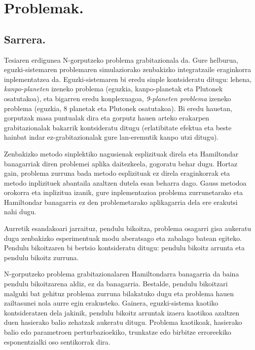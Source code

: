 \chapter{Problemak.}

\section{Sarrera.}


Tesiaren erdigunea N-gorputzeko problema grabitazionala da. Gure helburua, eguzki-sistemaren problemaren simulaziorako zenbakizko integratzaile eraginkorra inplementatzea da. Eguzki-sistemaren bi eredu sinple kontsideratu ditugu: lehena, \emph{kanpo-planeten} izeneko problema (eguzkia, kanpo-planetak eta Plutonek osatutakoa), eta bigarren eredu konplexuagoa, \emph{9-planeten problema} izeneko problema (eguzkia, 8 planetak eta Plutonek osatutakoa). Bi eredu hauetan, gorputzak masa puntualak dira eta gorputz hauen arteko erakarpen grabitazionalak bakarrik kontsideratu ditugu (erlatibitate efektua eta beste hainbat indar ez-grabitazionalak gure lan-eremutik kanpo utzi ditugu).

Zenbakizko metodo sinplektiko nagusienak esplizituak direla eta Hamiltondar banagarriak diren problemei aplika daitezkeela, gogoratu behar dugu. Hortaz gain, problema zurruna bada metodo esplizituak ez direla eraginkorrak eta metodo inplizituek abantaila azaltzen dutela esan beharra dago. Gauss metodoa orokorra  eta inplizitua izanik, gure inplementazioa problema zurrunetarako eta Hamiltondar banagarria ez den problemetarako  aplikagarria dela ere erakutsi nahi dugu. 
 
Aurretik esandakoari jarraituz, pendulu bikoitza, problema osagarri gisa aukeratu dugu zenbakizko esperimentuak modu aberatsago eta zabalago batean egiteko. Pendulu bikoitzaren bi bertsio kontsideratu ditugu: pendulu bikoitz arrunta eta pendulu bikoitz zurruna.

N-gorputzeko problema grabitazionalaren Hamiltondarra banagarria da baina pendulu bikoitzarena aldiz, ez da banagarria. Bestalde, pendulu bikoitzari malguki bat gehituz  problema zurruna bilakatuko dugu eta problema hauen zailtasunei nola aurre egin erakusteko. Gainera,  eguzki-sistema kaotiko \cite{Laskar1999}  kontsideratzen dela  jakinik, pendulu bikoitz arruntak izaera kaotikoa azaltzen duen hasierako balio zehatzak aukeratu ditugu. Problema kaotikoak,  hasierako balio edo parametroen perturbazioekiko, trunkatze edo birbitze erroreekiko esponentzialki oso sentikorrak dira.

